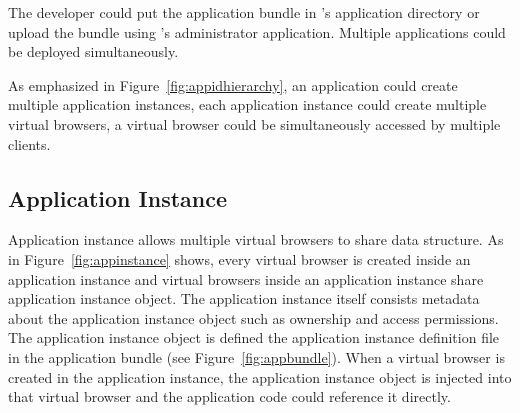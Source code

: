 The developer could put the application bundle in \cb's application 
directory or upload the bundle using \cb's administrator application.
Multiple applications could be deployed simultaneously.

\apphierarchyfig{}

As emphasized in Figure~\ref{fig:appidhierarchy},
an application could create multiple application instances,
each application instance could create multiple virtual browsers,
a virtual browser could be simultaneously accessed by multiple clients.



\subsection{Application Instance}
\label{sec:appins}
\appinstancefig{}


Application instance allows multiple virtual browsers to share data structure.
As in Figure~\ref{fig:appinstance} shows, 
every virtual browser is created inside an application instance
and virtual browsers inside an application instance share application instance object.
The application instance itself
consists metadata about the application instance object
 such as ownership and access permissions.
The application instance object is defined
the application instance definition file 
in the application bundle (see Figure~\ref{fig:appbundle}).
When a virtual browser is created in the application instance,
the application instance object is injected into that virtual browser
and the application code could reference it directly.

